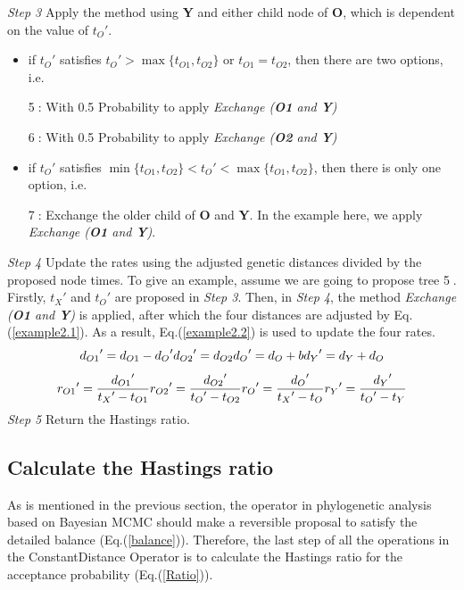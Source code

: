 \documentclass{bmcart}
\begin{document}
\emph{Step 3} Apply the method using \textbf{Y} and either child node of \textbf{O}, which is dependent on the value of ${t_O}'$.
\begin{itemize}
\item if ${t_O}'$ satisfies ${t_O}' > \max \{ {t_{O1}},{t_{O2}}\} $ or ${t_{O1}} = {t_{O2}}$, then there are two options, i.e.

\textcircled5: With 0.5 Probability to apply \textit{Exchange (\textbf{O1} and \textbf{Y})}

\textcircled6: With 0.5 Probability to apply \textit{Exchange (\textbf{O2} and \textbf{Y})}
\item if ${t_O}'$ satisfies $\min \{ {t_{O1}},{t_{O2}}\}  < {t_O}' < \max \{ {t_{O1}},{t_{O2}}\} $, then there is only one option, i.e.

\textcircled7: Exchange the older child of \textbf{O} and \textbf{Y}.  In the example here, we apply \textit{Exchange (\textbf{O1}  and \textbf{Y})}.
\end{itemize}

\emph{Step 4}  Update the rates using the adjusted genetic distances divided by the proposed node times. To give an example, assume we are going to propose tree \textcircled5. Firstly, ${t_X}'$ and ${t_O}'$ are proposed in \emph{Step 3}.  Then, in \emph{Step 4}, the method \textit{Exchange (\textbf{O1} and \textbf{Y})} is applied, after which the four distances are adjusted by Eq.(\ref{example2.1}). As a result, Eq.(\ref{example2.2}) is used to update the four rates.
\begin{equation}\label{example2.1}
{d_{O1}}' = {d_{O1}} - {d_O}'  \\
{d_{O2}}' = {d_{O2}}  \\
{d_O}' = {d_O} + b  \\
{d_Y}' = {d_Y} + {d_O} 
\end{equation}
\begin{equation}\label{example2.2}
{r_{O1}}' = \frac{{{d_{O1}}'}}{{{t_X}' - {t_{O1}}}} \\
{r_{O2}}' = \frac{{{d_{O2}}'}}{{{t_O}' - {t_{O2}}}} \\
{r_O}' = \frac{{{d_O}'}}{{{t_X}' - {t_O}}} \\
{r_Y}' = \frac{{{d_Y}'}}{{{t_O}' - {t_Y}}} 
\end{equation}
\emph{Step 5} Return the Hastings ratio.

\subsection*{Calculate the Hastings ratio}
As is mentioned in the previous section, the operator in phylogenetic analysis based on Bayesian MCMC should make a reversible proposal to satisfy the detailed balance (Eq.(\ref{balance})). Therefore, the last step of all the operations in the ConstantDistance Operator is to calculate the Hastings ratio for the acceptance probability (Eq.(\ref{Ratio})). 
\end{document}
